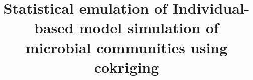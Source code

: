 
\newcommand{\bt}{{\bf t}}
\newcommand{\bB}{{\bf B}}
\newcommand{\bSigma}{{\boldsymbol{\Sigma}}}
\newcommand{\tbSigma}{{\tilde {\boldsymbol{\Sigma}}}}
\newcommand{\tbu}{{\tilde {\bf u}}}
\newcommand{\tbU}{{\tilde {\bf U}}}
\newcommand{\bh}{{\bf h}}
\newcommand{\bH}{{\bf H}}
\newcommand{\bD}{{\bf D}}
\newcommand{\bU}{{\bf U}}
\newcommand{\bu}{{\bf u}}
\newcommand{\bZ}{{\bf Z}}
\newcommand{\bz}{{\bf z}}
\newcommand{\bC}{{\bf C}}
\newcommand{\bc}{{\bf c}}
\newcommand{\bx}{{\bf x}}
\newcommand{\bX}{{\bf X}}
\newcommand{\by}{{\bf y}}
\newcommand{\bY}{{\bf Y}}
\newcommand{\bE}{{\bf E}}
\newcommand{\bW}{{\bf W}}
\newcommand{\tbx}{{\tilde {\bf x}}}
\newcommand{\tbX}{{\tilde {\bf X}}}
\newcommand{\tby}{{\tilde {\bf y}}}
\newcommand{\tbY}{{\tilde {\bf Y}}}
\newcommand{\hbX}{{\hat {\bf X}}}
\newcommand{\hbY}{{\hat {\bf Y}}}
\newcommand{\hby}{{\hat {\bf y}}}
\newcommand{\ty}{{\tilde {y}}}
\newcommand{\hy}{{\hat {y}}}
\newcommand{\bs}{{\bf s}}

\newcommand{\tC}{{\tilde {C}}}
\newcommand{\tP}{{\tilde {P}}}
\newcommand{\bK}{{\mathbf{K}}}
\newcommand{\bI}{{\mathbf{I}}}
\newcommand{\br}{{\mathbf{r}}}

\newcommand{\bGamma}{\mathbf{\Gamma}}
\newcommand{\hbGamma}{\hat {\mathbf{\Gamma}}}

\newcommand{\bgamma}{{\boldsymbol{\gamma}}}
\newcommand{\bepsilon}{{\boldsymbol{\varepsilon}}}
\newcommand{\tbepsilon}{{\tilde{\boldsymbol{\varepsilon}}}}
\newcommand{\hbepsilon}{{\hat{\boldsymbol{\varepsilon}}}}
\newcommand{\bbeta}{{\boldsymbol{\beta}}}
\newcommand{\hbbeta}{{\hat{\boldsymbol{\beta}}}}
\newcommand{\btau}{{{\boldsymbol{\tau}}}}
\newcommand{\balpha}{{\boldsymbol{\alpha}}}
\newcommand{\bhalpha}{{\hat{\boldsymbol{\alpha}}}}
\newcommand{\hbB}{{\hat{\boldsymbol{B}}}}
\newcommand{\hbSigma}{{\hat{\boldsymbol{\Sigma}}}}
\newcommand{\bmu}{{{\boldsymbol{\mu}}}}

\DeclareMathOperator*{\ssum}{{\textstyle \sum}}


%

%
\title{Statistical emulation of Individual-based model simulation of microbial communities using cokriging
}

